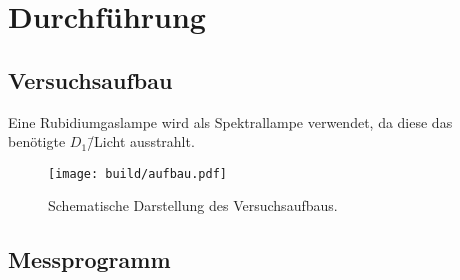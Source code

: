 \section{Durchführung}%
\label{sec:durchfuehrung}

\subsection{Versuchsaufbau}%
\label{sub:versuchsaufbau}

Eine Rubidiumgaslampe wird als Spektrallampe verwendet, da diese
das benötigte $D_1$\=/Licht ausstrahlt.

\begin{figure}[ht]
  \centering
  \texttt{[image: build/aufbau.pdf]}
  \caption{Schematische Darstellung des Versuchsaufbaus. \cite{anleitung}}
  \label{fig:aufbau}
\end{figure}

\subsection{Messprogramm}%
\label{sub:messprogramm}
